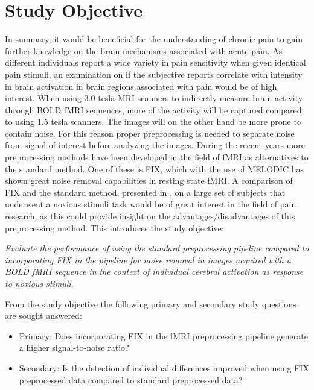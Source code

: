 \chapter{Study Objective}

In summary, it would be beneficial for the understanding of chronic pain to gain further knowledge on the brain mechanisms associated with acute pain. As different individuals report a wide variety in pain sensitivity when given identical pain stimuli, an examination on if the subjective reports correlate with intensity in brain activation in brain regions associated with pain would be of high interest. When using 3.0 tesla MRI scanners to indirectly measure brain activity through BOLD fMRI sequences, more of the activity will be captured compared to using 1.5 tesla scanners. The images will on the other hand be more prone to contain noise. For this reason proper preprocessing is needed to separate noise from signal of interest before analyzing the images. During the recent years more preprocessing methods have been developed in the field of fMRI as alternatives to the standard method. One of these is FIX, which with the use of MELODIC has shown great noise removal capabilities in resting state fMRI. A comparison of FIX and the standard method, presented in , on a large set of subjects that underwent a noxious stimuli task would be of great interest in the field of pain research, as this could provide insight on the advantages/disadvantages of this preprocessing method. This introduces the study objective:

\begin{center}

\textit{Evaluate the performance of using the standard preprocessing pipeline compared to incorporating FIX in the pipeline for noise removal in images acquired with a BOLD fMRI sequence in the context of individual cerebral activation as response to noxious stimuli.}

\end{center}

From the study objective the following primary and secondary study questions are sought answered: 

\begin{itemize}
	\item Primary: Does incorporating FIX in the fMRI preprocessing pipeline generate a higher signal-to-noise ratio?
	
	\item Secondary: Is the detection of individual differences improved when using FIX preprocessed data compared to standard preprocessed data?
	   
	 
\end{itemize}

